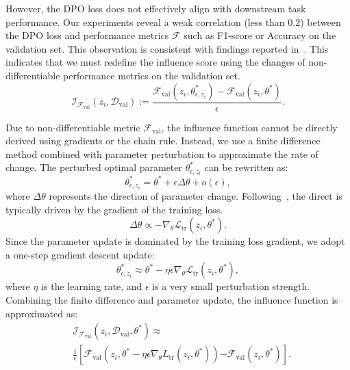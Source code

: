 However, the DPO loss does not effectively align with downstream task performance. Our experiments reveal a weak correlation (less than 0.2) between the DPO loss and performance metrics $\mathcal{F}$ such as F1-score or Accuracy on the validation set. This observation is consistent with findings reported in~\citet{DBLP:journals/corr/abs-2406-02900, DBLP:journals/corr/abs-2410-11677}. This indicates that we must redefine the influence score using the changes of non-differentiable performance metrics on the validation set.
\begin{equation}
\mathcal{I}_{\mathcal{F}_{\text{val}}}(z_i, \mathcal{D}_{\text{val}}) := \frac{\mathcal{F}_{\text{val}}(z_i, \theta_{\epsilon,z_i}^*) - \mathcal{F}_{\text{val}}(z_i, \theta^*)}{\epsilon}.
\end{equation}

Due to non-differentiable metric $\mathcal{F}_{\text{val}}$, the influence function cannot be directly derived using gradients or the chain rule. Instead, we use a finite difference method combined with parameter perturbation to approximate the rate of change. The perturbed optimal parameter $\theta_{\epsilon,z_i}^*$ can be rewritten as:
\begin{equation}
    \theta_{\epsilon,z_i}^* = \theta^* + \epsilon\Delta \theta + o(\epsilon),
\end{equation}
where $\Delta\theta$ represents the direction of parameter change. Following~\citet{yu2024mates}, the direct is typically driven by the gradient of the training loss.
\begin{equation}
    \Delta \theta \propto -\nabla_\theta \mathcal{L}_{\text{tr}}(z_i, \theta^*).
\end{equation}
Since the parameter update is dominated by the training loss gradient, we adopt a one-step gradient descent update:
\begin{equation}
    \theta_{\epsilon,z_i}^* \approx \theta^* - \eta\epsilon\nabla_\theta \mathcal{L}_{\text{tr}}(z_i,\theta^*),
\end{equation}
where $\eta$ is the learning rate, and $\epsilon$ is a very small perturbation strength. Combining the finite difference and parameter update, the influence function is approximated as:
\begin{equation}
\begin{split}
    &\mathcal{I}_{\mathcal{F}_{\text{val}}}(z_i, \mathcal{D}_{\text{val}}, \theta^*) \approx \\ &\frac{1}{\epsilon} \left[ \mathcal{F}_{\text{val}}(z_i,  \theta^* - \eta\epsilon\nabla_\theta L_{\text{tr}}(z_i,\theta^*)) \right. 
     \left. - \mathcal{F}_{\text{val}}(z_i,\theta^*) \right].
\end{split}
\end{equation}

